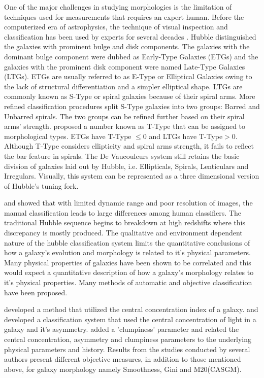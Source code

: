 \documentclass[fleqn,usenatbib]{mnras}
\begin{document}
One of the major challenges in studying morphologies is the limitation of techniques used for measurements that requires an expert human. Before the computerized era of astrophysics, the technique of visual inspection and classification has been used by experts for several decades \citep{hubble1926extragalactic, 1959HDP....53..275D,Edmondson464,1976ApJ...206..883V}. 
Hubble distinguished the galaxies with prominent bulge and disk components. The galaxies with the dominant bulge component were dubbed as Early-Type Galaxies (ETGs) and the galaxies with the prominent disk component were named Late-Type Galaxies (LTGs). ETGs are usually referred to as E-Type or Elliptical Galaxies owing to the lack of structural differentiation and a simpler elliptical shape.
LTGs are commonly known as S-Type or spiral galaxies because of their spiral arms. More refined classification procedures split S-Type galaxies into two groups: Barred and Unbarred spirals. The two groups can be refined further based on their spiral arms' strength. \citet{1963ApJS....8...31D} proposed a number known as T-Type that can be assigned to morphological types. ETGs have T-Type $\le 0$ and LTGs have T-Type$> 0$. Although T-Type considers ellipticity and spiral arms strength, it fails to reflect the bar feature in spirals. The De Vaucouleurs system still retains the basic division of galaxies laid out by Hubble, i.e. Ellipticals, Spirals, Lenticulars and Irregulars. Visually, this system can be represented as a three dimensional version of Hubble's tuning fork.

\citet{Naim/mnras/275.3.567} and \citet{abraham1996b} showed that with limited dynamic range and poor resolution of images, the manual classification leads to large differences among human classifiers. The traditional Hubble sequence begins to breakdown at high redshifts where this discrepancy is mostly produced. The qualitative and environment dependent nature of the hubble classification system limits the quantitative conclusions of how a galaxy's evolution and morphology is related to it's physical parameters. Many physical properties of galaxies have been shown to be correlated and this would expect a quantitative description of how a galaxy's morphology relates to it's physical properties. Many methods of automatic and objective classification have been proposed. 


\citet{okamura1994} developed a method that utilized the central concentration index of a galaxy. \citet{abraham1994morphologies} and \citet{abraham1996b} developed a classification system that used the central concentration of light in a galaxy and it's asymmetry. \citet{Conselice_2003} added a 'clumpiness' parameter and related the central concentration, asymmetry and clumpiness parameters to the underlying physical parameters and history. Results from the studies conducted by several authors \citep{1996ApJS..107....1A,Conselice_2000,2004AJ....128..163L} present different objective measures, in addition to those mentioned above, for galaxy morphology namely Smoothness, Gini and M20(CASGM). 
\end{document}
